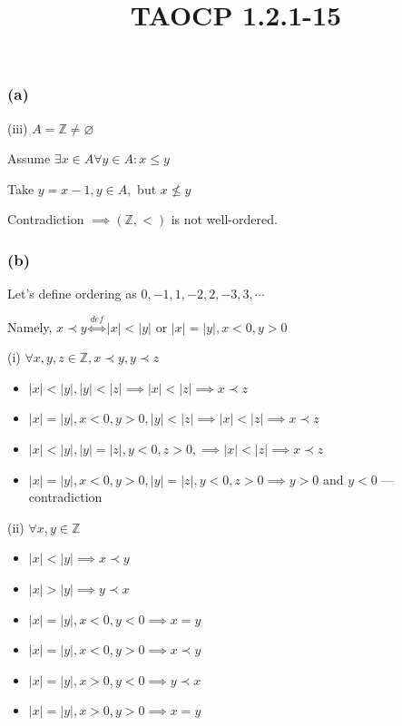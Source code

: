 \documentclass{article}
\title{TAOCP 1.2.1\mbox{-}15}
\begin{document}
\maketitle

\subsubsection*{(a)}

(iii) \( A = \mathbb{Z} \neq \varnothing \)

Assume \( \exists x \in A \forall y \in A: x \leq y \)

Take \( y = x - 1, y \in A, \) but \( x \not\leq y \)

Contradiction \( \implies (\mathbb{Z}, <) \) is not well-ordered.

\subsubsection*{(b)}

Let's define ordering as \( 0, -1, 1, -2, 2, -3, 3, \cdots \)

Namely, \( x \prec y \overset{def}{\iff} |x| < |y| \) or \( |x|=|y|, x < 0, y > 0 \)

(i) \( \forall x, y, z \in \mathbb{Z}, x \prec y, y \prec z \)

\begin{itemize}
\item \( |x|<|y|, |y|<|z| \implies |x|<|z| \implies x \prec z \)
\item \( |x|=|y|, x < 0, y > 0, |y| < |z| \implies |x| < |z| \implies x \prec z \)
\item \( |x|<|y|, |y| = |z|, y < 0, z > 0, \implies |x| < |z| \implies x \prec z \)
\item \( |x|=|y|, x < 0,  y > 0, |y| = |z|, y < 0, z > 0 \implies y > 0 \) and \( y < 0 \) --- contradiction
\end{itemize}

(ii) \( \forall x, y \in \mathbb{Z} \)

\begin{itemize}
\item \( |x|<|y| \implies x \prec y \)
\item \( |x|>|y| \implies y \prec x \)
\item \( |x|=|y|, x < 0, y < 0 \implies x = y \)
\item \( |x|=|y|, x < 0, y > 0 \implies x \prec y \)
\item \( |x|=|y|, x > 0, y < 0 \implies y \prec x \)
\item \( |x|=|y|, x > 0, y > 0 \implies x = y \)
\end{itemize}
\end{document}
